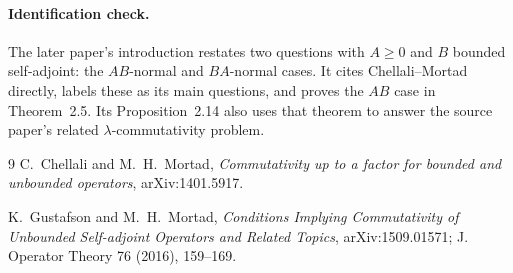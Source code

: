 \documentclass[10pt]{article}
\begin{document}
\paragraph{Identification check.}
The later paper's introduction restates two questions with $A\geq0$ and
$B$ bounded self-adjoint: the $AB$-normal and $BA$-normal cases.  It cites
Chellali--Mortad directly, labels these as its main questions, and proves the
$AB$ case in Theorem~2.5.  Its Proposition~2.14 also uses that theorem to
answer the source paper's related $\lambda$-commutativity problem.

\begin{thebibliography}{9}
C.~Chellali and M.~H.~Mortad,
\emph{Commutativity up to a factor for bounded and unbounded operators},
arXiv:1401.5917.

K.~Gustafson and M.~H.~Mortad,
\emph{Conditions Implying Commutativity of Unbounded Self-adjoint Operators
and Related Topics}, arXiv:1509.01571; J. Operator Theory 76 (2016), 159--169.
\end{thebibliography}
\end{document}

